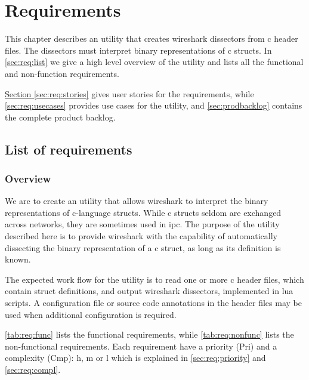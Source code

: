 \chapter{Requirements}
\label{chap:req:requirements}
This chapter describes an \gls{utility} that creates \Gls{wireshark} \glspl{dissector} from \Gls{c}
\gls{header} files. The \glspl{dissector} must interpret \gls{binary} representations of \Gls{c}
\glspl{struct}. In \autoref{sec:req:list} we give a high level overview of the
\gls{utility} and lists all the functional and non-function requirements.

\hyperref[sec:req:stories]{Section \ref*{sec:req:stories}} gives user stories
for the requirements, while \autoref{sec:req:usecases} provides use cases for
the \gls{utility}, and \autoref{sec:prodbacklog} contains the complete product
backlog.

\section{List of requirements}
\label{sec:req:list}

\subsection{Overview}
We are to create an \gls{utility} that allows \Gls{wireshark} to interpret the \gls{binary}
representations of \Gls{c}-language \glspl{struct}. While \Gls{c} \glspl{struct} seldom are exchanged
across networks, they are sometimes used in \gls{ipc}. The
purpose of the \gls{utility} described here is to provide \Gls{wireshark} with the
capability of automatically dissecting the \gls{binary} representation of a \Gls{c} \gls{struct},
as long as its definition is known.

The expected work flow for the \gls{utility} is to read one or more \Gls{c} \gls{header} files,
which contain \gls{struct} definitions, and output \Gls{wireshark} \glspl{dissector}, implemented
in \Gls{lua} scripts. A configuration file or source code annotations in the \gls{header}
files may be used when additional configuration is required.

\autoref{tab:req:func} lists the functional requirements, while
\autoref{tab:req:nonfunc} lists the non-functional requirements. Each
requirement have a priority (Pri) and a complexity (Cmp): \Gls{h}, 
\Gls{m} or \Gls{l} which is explained in \autoref{sec:req:priority} and
\autoref{sec:req:compl}.

